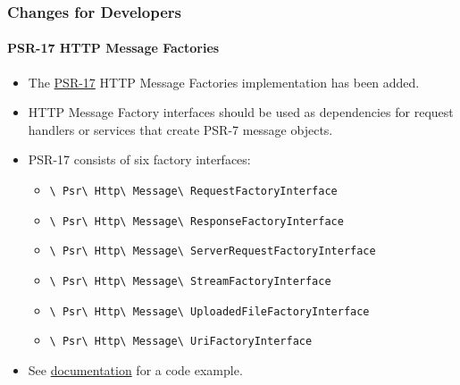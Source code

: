 
\begin{frame}[fragile]
	\frametitle{Changes for Developers}
	\framesubtitle{PSR-17 HTTP Message Factories}

	\begin{itemize}
		\item The \href{https://www.php-fig.org/psr/psr-17/}{PSR-17}
			HTTP Message Factories implementation has been added.
		\item HTTP Message Factory interfaces should be used as dependencies for
			request handlers or services that create PSR-7 message objects.
		\item PSR-17 consists of six factory interfaces:

			\begin{itemize}\smaller
				\item \texttt{\textbackslash
					Psr\textbackslash
					Http\textbackslash
					Message\textbackslash
					RequestFactoryInterface}
				\item \texttt{\textbackslash
					Psr\textbackslash
					Http\textbackslash
					Message\textbackslash
					ResponseFactoryInterface}
				\item \texttt{\textbackslash
					Psr\textbackslash
					Http\textbackslash
					Message\textbackslash
					ServerRequestFactoryInterface}
				\item \texttt{\textbackslash
					Psr\textbackslash
					Http\textbackslash
					Message\textbackslash
					StreamFactoryInterface}
				\item \texttt{\textbackslash
					Psr\textbackslash
					Http\textbackslash
					Message\textbackslash
					UploadedFileFactoryInterface}
				\item \texttt{\textbackslash
					Psr\textbackslash
					Http\textbackslash
					Message\textbackslash
					UriFactoryInterface}

			\end{itemize}\normalsize

		\item See
			\href{https://docs.typo3.org/c/typo3/cms-core/master/en-us/Changelog/10.1/Feature-89018-ProvideImplementationForPSR-17HTTPMessageFactories.html}{documentation}
			for a code example.

	\end{itemize}

\end{frame}

